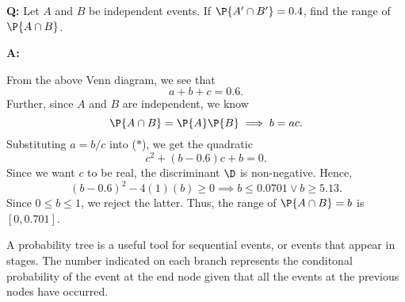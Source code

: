\begin{example}
    \phantom{.}

    \textbf{Q:} Let $A$ and $B$ be independent events. If $\P{A' \cap B'} = 0.4$, find the range of $\P{A \cap B}$.

    \textbf{A:}
    \begin{center}
    \end{center}
    From the above Venn diagram, we see that \[a + b + c = 0.6. \tag{$\ast$}\] Further, since $A$ and $B$ are independent, we know \[\P{A \cap B} = \P{A} \P{B} \implies b = ac.\] Substituting $a = b/c$ into ($\ast$), we get the quadratic \[c^2 + (b - 0.6)c + b = 0.\] Since we want $c$ to be real, the discriminant $\D$ is non-negative. Hence, \[(b-0.6)^2 - 4(1)(b) \geq 0 \implies b \leq 0.0701 \lor b \geq 5.13.\] Since $0 \leq b \leq 1$, we reject the latter. Thus, the range of $\P{A \cap B} = b$ is $[0, 0.701]$.
\end{example}

\begin{method}
    A probability tree is a useful tool for sequential events, or events that appear in stages. The number indicated on each branch represents the conditonal probability of the event at the end node given that all the events at the previous nodes have occurred.
\end{method}

